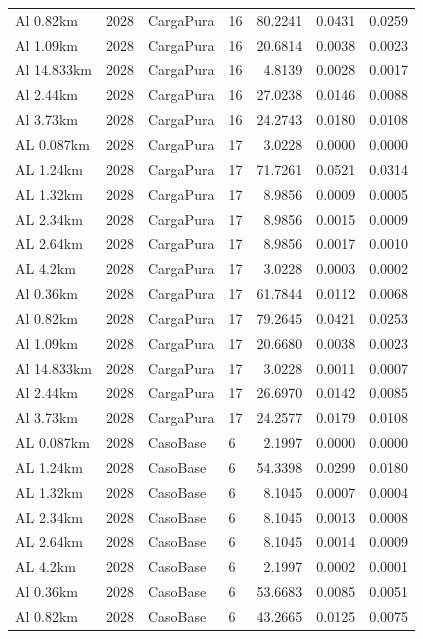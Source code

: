 \documentclass[11pt,a4paper]{article}
\begin{document}
\begin{longtable}{llllrrr}
Al 0.82km & 2028 & CargaPura & 16 & 80.2241 & 0.0431 & 0.0259 \\
Al 1.09km & 2028 & CargaPura & 16 & 20.6814 & 0.0038 & 0.0023 \\
Al 14.833km & 2028 & CargaPura & 16 & 4.8139 & 0.0028 & 0.0017 \\
Al 2.44km & 2028 & CargaPura & 16 & 27.0238 & 0.0146 & 0.0088 \\
Al 3.73km & 2028 & CargaPura & 16 & 24.2743 & 0.0180 & 0.0108 \\
AL 0.087km & 2028 & CargaPura & 17 & 3.0228 & 0.0000 & 0.0000 \\
AL 1.24km & 2028 & CargaPura & 17 & 71.7261 & 0.0521 & 0.0314 \\
AL 1.32km & 2028 & CargaPura & 17 & 8.9856 & 0.0009 & 0.0005 \\
AL 2.34km & 2028 & CargaPura & 17 & 8.9856 & 0.0015 & 0.0009 \\
AL 2.64km & 2028 & CargaPura & 17 & 8.9856 & 0.0017 & 0.0010 \\
AL 4.2km & 2028 & CargaPura & 17 & 3.0228 & 0.0003 & 0.0002 \\
Al 0.36km & 2028 & CargaPura & 17 & 61.7844 & 0.0112 & 0.0068 \\
Al 0.82km & 2028 & CargaPura & 17 & 79.2645 & 0.0421 & 0.0253 \\
Al 1.09km & 2028 & CargaPura & 17 & 20.6680 & 0.0038 & 0.0023 \\
Al 14.833km & 2028 & CargaPura & 17 & 3.0228 & 0.0011 & 0.0007 \\
Al 2.44km & 2028 & CargaPura & 17 & 26.6970 & 0.0142 & 0.0085 \\
Al 3.73km & 2028 & CargaPura & 17 & 24.2577 & 0.0179 & 0.0108 \\
AL 0.087km & 2028 & CasoBase & 6 & 2.1997 & 0.0000 & 0.0000 \\
AL 1.24km & 2028 & CasoBase & 6 & 54.3398 & 0.0299 & 0.0180 \\
AL 1.32km & 2028 & CasoBase & 6 & 8.1045 & 0.0007 & 0.0004 \\
AL 2.34km & 2028 & CasoBase & 6 & 8.1045 & 0.0013 & 0.0008 \\
AL 2.64km & 2028 & CasoBase & 6 & 8.1045 & 0.0014 & 0.0009 \\
AL 4.2km & 2028 & CasoBase & 6 & 2.1997 & 0.0002 & 0.0001 \\
Al 0.36km & 2028 & CasoBase & 6 & 53.6683 & 0.0085 & 0.0051 \\
Al 0.82km & 2028 & CasoBase & 6 & 43.2665 & 0.0125 & 0.0075 \\

\end{longtable}
\end{document}
